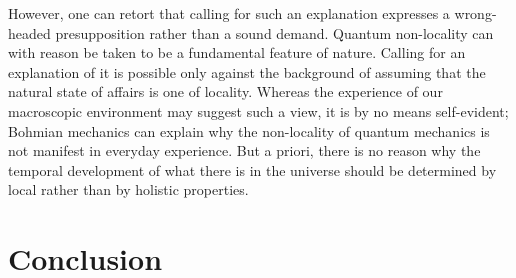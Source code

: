\documentclass[12pt,a4paper]{article}
\theoremstyle{definition}
\begin{document}
However, one can retort that calling for such an explanation expresses a wrong-headed presupposition rather than a sound demand. Quantum non-locality can with reason be taken to be a fundamental feature of nature. Calling for an explanation of it is possible only against the background of assuming that the natural state of affairs is one of locality. Whereas the experience of our macroscopic environment may suggest such a view, it is by no means self-evident; Bohmian mechanics can explain why the non-locality of quantum mechanics is not manifest in everyday experience. But a priori, there is no reason why the temporal development of what there is in the universe should be determined by local rather than by holistic properties.

\section{Conclusion}
\end{document}
